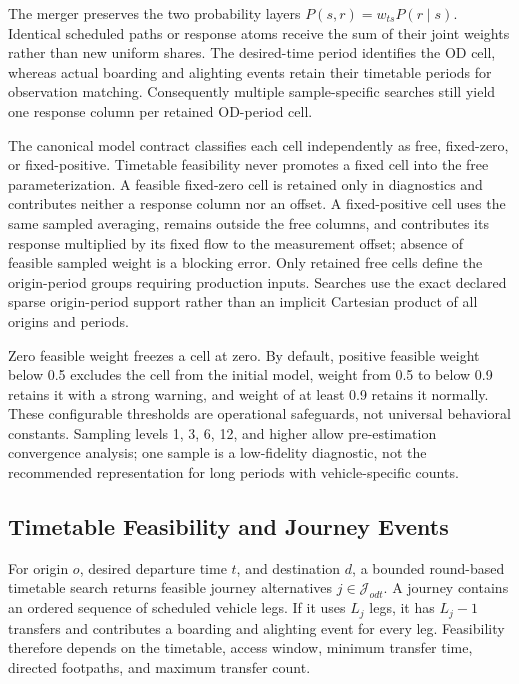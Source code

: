 The merger preserves the two probability layers
$P(s,r)=w_{ts}P(r\mid s)$. Identical scheduled paths or response atoms receive
the sum of their joint weights rather than new uniform shares. The desired-time
period identifies the OD cell, whereas actual boarding and alighting events
retain their timetable periods for observation matching. Consequently multiple
sample-specific searches still yield one response column per retained
OD-period cell.

The canonical model contract classifies each cell independently as free,
fixed-zero, or fixed-positive. Timetable feasibility never promotes a fixed
cell into the free parameterization. A feasible fixed-zero cell is retained
only in diagnostics and contributes neither a response column nor an offset.
A fixed-positive cell uses the same sampled averaging, remains outside the free
columns, and contributes its response multiplied by its fixed flow to the
measurement offset; absence of feasible sampled weight is a blocking error.
Only retained free cells define the origin-period groups requiring production
inputs. Searches use the exact declared sparse origin-period support rather
than an implicit Cartesian product of all origins and periods.

Zero feasible weight freezes a cell at zero. By default, positive feasible
weight below 0.5 excludes the cell from the initial model, weight from 0.5 to
below 0.9 retains it with a strong warning, and weight of at least 0.9 retains
it normally. These configurable thresholds are operational safeguards, not
universal behavioral constants. Sampling levels 1, 3, 6, 12, and higher allow
pre-estimation convergence analysis; one sample is a low-fidelity diagnostic,
not the recommended representation for long periods with vehicle-specific
counts.

\subsection{Timetable Feasibility and Journey Events}

For origin $o$, desired departure time $t$, and destination $d$, a bounded
round-based timetable search returns feasible journey alternatives
$j\in\mathcal J_{odt}$. A journey contains an ordered sequence of scheduled
vehicle legs. If it uses $L_j$ legs, it has $L_j-1$ transfers and contributes a
boarding and alighting event for every leg. Feasibility therefore depends on
the timetable, access window, minimum transfer time, directed footpaths, and
maximum transfer count.

